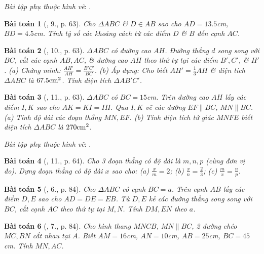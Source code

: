 \documentclass{article}
\newtheorem{baitoan}{Bài toán}
\begin{document}
\noindent\textit{Bài tập phụ thuộc hình vẽ}: \cite[?3, 6.--8., pp. 62--63]{SGK_Toan_8_tap_2}.

\begin{baitoan}[\cite{SGK_Toan_8_tap_2}, 9., p. 63]
	Cho $\Delta ABC$ \& $D\in AB$ sao cho $AD = 13.5$\emph{cm}, $BD = 4.5$\emph{cm}. Tính tỷ số các khoảng cách từ các điểm $D$ \& $B$ đến cạnh $AC$.
\end{baitoan}

\begin{baitoan}[\cite{SGK_Toan_8_tap_2}, 10., p. 63]
	$\Delta ABC$ có đường cao $AH$. Đường thẳng $d$ song song với $BC$, cắt các cạnh $AB,AC$, \& đường cao $AH$ theo thứ tự tại các điểm $B',C'$, \& $H'$. (a) Chứng minh: $\frac{AH'}{AH} = \frac{B'C'}{BC}$. (b) Áp dụng: Cho biết $AH' = \frac{1}{3}AH$ \& diện tích $\Delta ABC$ là $67.5{\rm cm}^2$. Tính diện tích $\Delta AB'C'$.
\end{baitoan}

\begin{baitoan}[\cite{SGK_Toan_8_tap_2}, 11., p. 63]
	$\Delta ABC$ có $BC = 15$\emph{cm}. Trên đường cao $AH$ lấy các điểm $I,K$ sao cho $AK = KI = IH$. Qua $I,K$ vẽ các đường $EF\parallel BC$, $MN\parallel BC$. (a) Tính độ dài các đoạn thẳng $MN,EF$. (b) Tính diện tích tứ giác $MNFE$ biết diện tích $\Delta ABC$ là $270{\rm cm}^2$.
\end{baitoan}
\noindent\textit{Bài tập phụ thuộc hình vẽ}: \cite[12.--13., p. 64]{SGK_Toan_8_tap_2}.

\begin{baitoan}[\cite{SGK_Toan_8_tap_2}, 11., p. 64]
	Cho 3 đoạn thẳng có độ dài là $m,n,p$ (cùng đơn vị đo). Dựng đoạn thẳng có độ dài $x$ sao cho: (a) $\frac{x}{m} = 2$; (b) $\frac{x}{n} = \frac{2}{3}$; (c) $\frac{m}{x} = \frac{n}{p}$.
\end{baitoan}

\begin{baitoan}[\cite{SBT_Toan_8_tap_2}, 6., p. 84]
	Cho $\Delta ABC$ có cạnh $BC = a$. Trên cạnh $AB$ lấy các điểm $D,E$ sao cho $AD = DE = EB$. Từ $D,E$ kẻ các đường thẳng song song với $BC$, cắt cạnh $AC$ theo thứ tự tại $M,N$. Tính $DM,EN$ theo $a$.	
\end{baitoan}

\begin{baitoan}[\cite{SBT_Toan_8_tap_2}, 7., p. 84]
	Cho hình thang $MNCB$, $MN\parallel BC$, 2 đường chéo $MC,BN$ cắt nhau tại $A$. Biết $AM = 16$\emph{cm}, $AN = 10$\emph{cm}, $AB = 25$\emph{cm}, $BC = 45$\emph{cm}. Tính $MN,AC$.
\end{baitoan}
\end{document}
